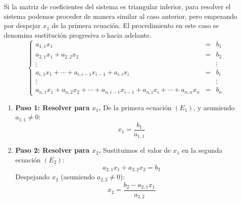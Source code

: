 \documentclass{beamer}
\begin{document}
\begin{frame}[fragile]
  Si la matriz de coeficientes del sistema es triangular inferior, para resolver el sistema podemos proceder de manera similar al caso anterior, pero empezando por despejar $x_1$ de la primera ecuaci\'on. El procedimiento en este caso se denomina sustituci\'on progresiva o hacia adelante.
  $$
    \left\{\begin{array}{lcc}
            a_{1,1}x_1  & = & b_1\\
            a_{2,1}x_1 + a_{2,2}x_2 & = & b_2\\
              \vdots & & \vdots\\
            a_{i,1}x_1 + \cdots + a_{i,i-1}x_{i-1} + a_{i,i}x_i  & = & b_i\\
            \vdots & & \vdots\\
            a_{n,1}x_{1} + a_{n,2}x_2 + \cdots + a_{n,i-1}x_{i-1} + a_{n,i}x_i + \cdots + a_{n,n}x_n & = & b_{n}
           \end{array}\right.
    $$
  \end{frame}
\begin{frame}[fragile]  
  \begin{enumerate}
    \item<1-> \textbf{Paso 1: Resolver para $x_1$.}
    De la primera ecuaci\'on $(E_1)$, y asumiendo $a_{1,1} \neq 0$:
    $$x_1 = \frac{b_1}{a_{1,1}}$$
    \item<2-> \textbf{Paso 2: Resolver para $x_2$.}
    Sustituimos el valor de $x_1$ en la segunda ecuaci\'on $(E_2)$:
    $$a_{2,1}x_1 + a_{2,2}x_2 = b_2$$
    Despejando $x_2$ (asumiendo $a_{2,2} \neq 0$):
    $$x_2 = \frac{b_2 - a_{2,1}x_1}{a_{2,2}}$$
   
  \end{enumerate}
\end{frame}
\end{document}
